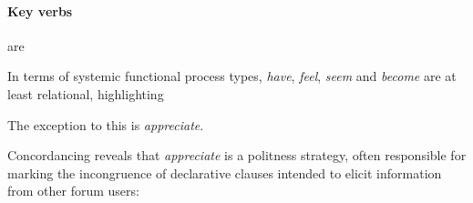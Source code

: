 \paragraph{Key verbs} are 

In terms of systemic functional process types, \emph{have}, \emph{feel}, \emph{seem} and \emph{become} are at least relational, highlighting 

The exception to this is \emph{appreciate}.

Concordancing reveals that \emph{appreciate} is a politness strategy, often responsible for marking the incongruence of declarative clauses intended to elicit information from other forum users:

\begin{table}

\centering 
\footnotesize

\begin{tabular}{lrrl}


\end{tabular}
\end{table}
